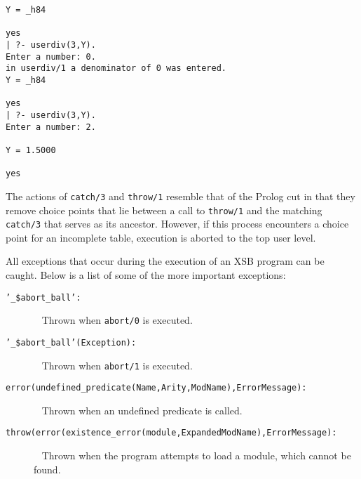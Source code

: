 \begin{description}
\begin{small}
\begin{verbatim}
Y = _h84

yes
| ?- userdiv(3,Y).
Enter a number: 0.
in userdiv/1 a denominator of 0 was entered.
Y = _h84

yes
| ?- userdiv(3,Y).
Enter a number: 2.

Y = 1.5000

yes
\end{verbatim}
\end{small}

The actions of {\tt catch/3} and {\tt throw/1} resemble that of the
Prolog cut in that they remove choice points that lie between a call
to {\tt throw/1} and the matching {\tt catch/3} that serves as its
ancestor.  However, if this process encounters a choice point for an
incomplete table, execution is aborted to the top user level.

\end{description}

All exceptions that occur during the execution of an XSB program can be caught.
Below is a list of some of the more important exceptions:
\begin{description}
\item[\tt '\_\$abort\_ball':]~ 
  Thrown when {\tt abort/0} is executed.
\item[\tt '\_\$abort\_ball'(Exception):]~
  Thrown when {\tt abort/1} is executed.
\item[\tt error(undefined\_predicate(Name,Arity,ModName),ErrorMessage):]~
  Thrown when an undefined predicate is called.
\item[\tt throw(error(existence\_error(module,ExpandedModName),ErrorMessage):]~
  Thrown when the program attempts to load a module, which cannot be
  found.
\end{description}



